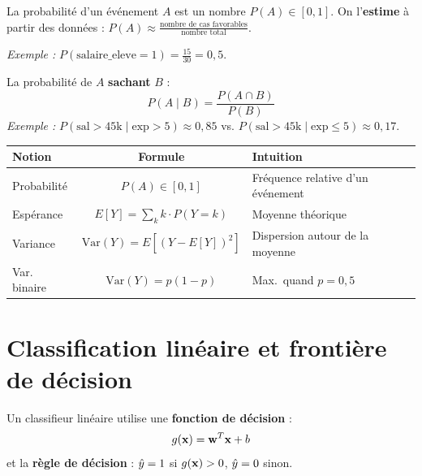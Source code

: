 \begin{definitionbox}[Probabilit\'{e}]
    La probabilit\'{e} d'un \'{e}v\'{e}nement $A$ est un nombre $P(A) \in [0, 1]$.
    On l'\textbf{estime} \`{a} partir des donn\'{e}es :
    $P(A) \approx \frac{\text{nombre de cas favorables}}{\text{nombre total}}$.

    \medskip
    \emph{Exemple :} $P(\text{salaire\_eleve} = 1) = \frac{15}{30} = 0{,}5$.
\end{definitionbox}

\begin{definitionbox}
    La probabilit\'{e} de $A$ \textbf{sachant} $B$ :
    \begin{equation}
        P(A \mid B) = \frac{P(A \cap B)}{P(B)}
        \label{eq:cond}
    \end{equation}
    \emph{Exemple :} $P(\text{sal}{>}45\text{k} \mid \text{exp}{>}5) \approx 0{,}85$
    \;vs.\;
    $P(\text{sal}{>}45\text{k} \mid \text{exp}{\leq}5) \approx 0{,}17$.
\end{definitionbox}

\begin{center}
\renewcommand{\arraystretch}{1.3}
\begin{tabularx}{0.92\textwidth}{l c X}
    \toprule
    \textbf{Notion} & \textbf{Formule} & \textbf{Intuition} \\
    \midrule
    Probabilit\'{e}     & $P(A) \in [0,1]$ & Fr\'{e}quence relative d'un \'{e}v\'{e}nement \\
    Esp\'{e}rance        & $E[Y] = \sum_k k \cdot P(Y{=}k)$ & Moyenne th\'{e}orique \\
    Variance           & $\text{Var}(Y) = E[(Y{-}E[Y])^2]$ & Dispersion autour de la moyenne \\
    Var. binaire       & $\text{Var}(Y) = p(1{-}p)$ & Max.\ quand $p = 0{,}5$ \\
    \bottomrule
\end{tabularx}
\end{center}

\section{Classification lin\'{e}aire et fronti\`{e}re de d\'{e}cision}

\begin{definitionbox}
    Un classifieur lin\'{e}aire utilise une \textbf{fonction de d\'{e}cision} :
    \begin{equation}
        g(\mathbf{x}) = \mathbf{w}^T \mathbf{x} + b
        \label{eq:decision}
    \end{equation}
    et la \textbf{r\`{e}gle de d\'{e}cision} :
    $\hat{y} = 1$ si $g(\mathbf{x}) > 0$, \quad $\hat{y} = 0$ sinon.
\end{definitionbox}

